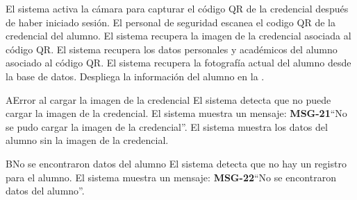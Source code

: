 \begin{UCtrayectoria}
	\UCpaso El sistema activa la cámara para capturar el código QR de la credencial  después de haber iniciado sesión.
	\UCpaso[\UCactor] El personal de seguridad escanea el codigo QR de la credencial del alumno.
	\UCpaso El sistema recupera la imagen de la credencial asociada al código QR. 
	\UCpaso El sistema recupera los datos personales y académicos del alumno asociado al código QR. 
	\UCpaso El sistema recupera la fotografía actual del alumno desde la base de datos.
	\UCpaso Despliega la información del alumno en la .
\end{UCtrayectoria}
\begin{UCtrayectoriaA}{A}{Error al cargar la imagen de la credencial}
	\UCpaso El sistema detecta que no puede cargar la imagen de la credencial.
	\UCpaso El sistema muestra un mensaje: {\bf MSG-21}{``No se pudo cargar la imagen de la credencial''}.
	\UCpaso El sistema muestra los datos del alumno sin la imagen de la credencial.
\end{UCtrayectoriaA}
\begin{UCtrayectoriaA}{B}{No se encontraron datos del alumno}
	\UCpaso El sistema detecta que no hay un registro para el alumno.
	\UCpaso El sistema muestra un mensaje: {\bf MSG-22}{``No se encontraron datos del alumno''}.

\end{UCtrayectoriaA}
